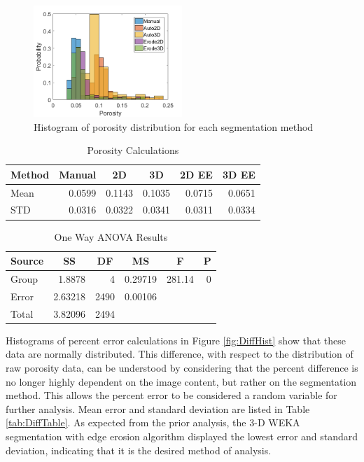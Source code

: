 \documentclass[11pt, twocolumn]{article}
\begin{document}
\begin{figure}[H]
	\centering
	\includegraphics[width=0.5\textwidth]{DataHistograms.png}
	\caption{Histogram of porosity distribution for each segmentation method}
	\label{fig:DataHist}
\end{figure}
\begin{table}[htbp]
	\centering
	\caption{Porosity Calculations}
	\begin{tabular}{|l|r|r|r|r|r|}
		\toprule
		Method & \multicolumn{1}{c|}{Manual} & \multicolumn{1}{c|}{2D} & \multicolumn{1}{c|}{3D} & \multicolumn{1}{c|}{2D EE} & \multicolumn{1}{c|}{3D EE} \\
		\midrule
		Mean  & 0.0599 & 0.1143 & 0.1035 & 0.0715 & 0.0651 \\
		\midrule
		STD   & 0.0316 & 0.0322 & 0.0341 & 0.0311 & 0.0334 \\
		\bottomrule
	\end{tabular}%
	\label{tab:DataTable}%
\end{table}%
\begin{table}[htbp]
	\centering
	\caption{One Way ANOVA Results}
	\begin{tabular}{|lrrrrr|}
		\toprule
		\multicolumn{1}{|c}{Source} & \multicolumn{1}{c}{SS} & \multicolumn{1}{c}{DF} & \multicolumn{1}{c}{MS} & \multicolumn{1}{c}{F} & \multicolumn{1}{c|}{P } \\
		\midrule
		Group & 1.8878 & 4     & 0.29719 & 281.14 & 0 \\
		Error & 2.63218 & 2490  & 0.00106 &       &  \\
		Total & 3.82096 & 2494  &       &       &  \\
		\bottomrule
	\end{tabular}%
	\label{tab:OneWay}%
\end{table}%

Histograms of percent error calculations in Figure \ref{fig:DiffHist} show that these data are normally distributed. This difference, with respect to the distribution of raw porosity data, can be understood by considering that the percent difference is no longer highly dependent on the image content, but rather on the segmentation method. This allows the percent error to be considered a random variable for further analysis. Mean error and standard deviation are listed in Table \ref{tab:DiffTable}. As expected from the prior analysis, the 3-D WEKA segmentation with edge erosion algorithm displayed the lowest error and standard deviation, indicating that it is the desired method of analysis. 
\end{document}
